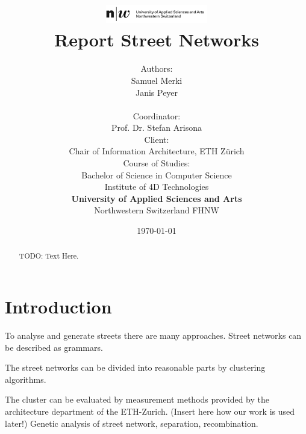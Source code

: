 \documentclass[11pt, a4paper]{report}
\begin{document}
\title{
    \includegraphics[width=1.75in]{fhnw_fhnw_logo_en.png} \\
    \vspace*{1in}
    \textbf{Report Street Networks}}
\author{
    Authors: \\
    Samuel Merki\\
    Janis Peyer\\
    \vspace*{0.4in} \\
    Coordinator: \\
    Prof. Dr. Stefan Arisona
    \vspace*{0.4in} \\
    Client: \\
    Chair of Information Architecture,
    ETH Zürich
    \vspace*{0.4in} \\
    Course of Studies: \\ Bachelor of Science in Computer Science
    \vspace*{0.4in} \\
    Institute of 4D Technologies \\
    \textbf{University of Applied Sciences and Arts  }\\
    Northwestern Switzerland FHNW
} \date{\today}
\maketitle
\setcounter{page}{1}

\tableofcontents

\begin{abstract}
    TODO: Text Here.
\end{abstract}

\chapter{Introduction}
To analyse and generate streets there are many approaches. Street networks can be described as grammars. 

The street networks can be divided into reasonable parts by clustering algorithms. 

The cluster can be evaluated by measurement methods provided by the architecture department of the ETH-Zurich. 
(Insert here how our work is used later!)
Genetic analysis of street network, separation, recombination.
\end{document}
